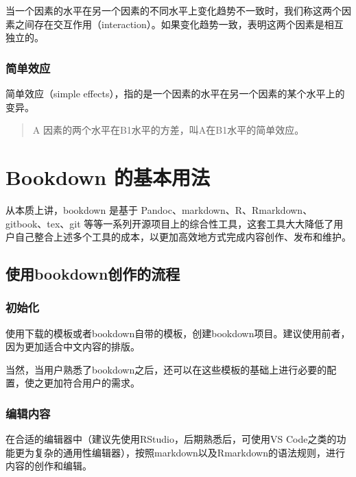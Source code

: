 \documentclass[]{ctexbook}
\begin{document}
当一个因素的水平在另一个因素的不同水平上变化趋势不一致时，我们称这两个因素之间存在交互作用（interaction）。如果变化趋势一致，表明这两个因素是相互独立的。

\hypertarget{ux7b80ux5355ux6548ux5e94}{%
\subsection{简单效应}\label{ux7b80ux5355ux6548ux5e94}}

简单效应（simple effects），指的是一个因素的水平在另一个因素的某个水平上的变异。

\begin{quote}
A 因素的两个水平在B1水平的方差，叫A在B1水平的简单效应。
\end{quote}

\hypertarget{basic}{%
\chapter{Bookdown 的基本用法}\label{basic}}

从本质上讲，bookdown 是基于 Pandoc、markdown、R、Rmarkdown、gitbook、tex、git 等等一系列开源项目上的综合性工具，这套工具大大降低了用户自己整合上述多个工具的成本，以更加高效地方式完成内容创作、发布和维护。

\hypertarget{ux4f7fux7528bookdownux521bux4f5cux7684ux6d41ux7a0b}{%
\section{使用bookdown创作的流程}\label{ux4f7fux7528bookdownux521bux4f5cux7684ux6d41ux7a0b}}

\hypertarget{ux521dux59cbux5316}{%
\subsection{初始化}\label{ux521dux59cbux5316}}

使用下载的模板或者bookdown自带的模板，创建bookdown项目。建议使用前者，因为更加适合中文内容的排版。

当然，当用户熟悉了bookdown之后，还可以在这些模板的基础上进行必要的配置，使之更加符合用户的需求。

\hypertarget{ux7f16ux8f91ux5185ux5bb9}{%
\subsection{编辑内容}\label{ux7f16ux8f91ux5185ux5bb9}}

在合适的编辑器中（建议先使用RStudio，后期熟悉后，可使用VS Code之类的功能更为复杂的通用性编辑器），按照markdown以及Rmarkdown的语法规则，进行内容的创作和编辑。
\end{document}
